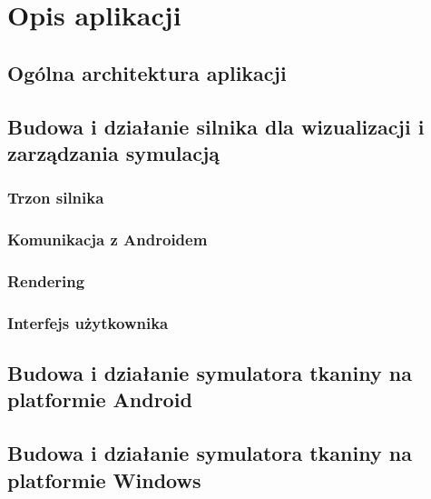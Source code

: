 \chapter{Opis aplikacji}
\label{t:praktyka}

	\section{Ogólna architektura aplikacji}
	\label{t:praktyka:ogolne}
	
	
	\section{Budowa i działanie silnika dla wizualizacji i zarządzania symulacją}
	\label{t:praktyka:silnik}
	
		\subsection{Trzon silnika}
		\label{t:praktyka:silnik:trzon}
		
		\subsection{Komunikacja z Androidem}
		\label{t:praktyka:silnik:andro}
		
		\subsection{Rendering}
		\label{t:praktyka:silnik:render}
		
		\subsection{Interfejs użytkownika}
		\label{t:praktyka:silnik:gui}
	
	
	\section{Budowa i działanie symulatora tkaniny na platformie Android}
	\label{t:praktyka:symulacja}
	
	
	\section{Budowa i działanie symulatora tkaniny na platformie Windows}
	\label{t:praktyka:symulacjapc}
	
